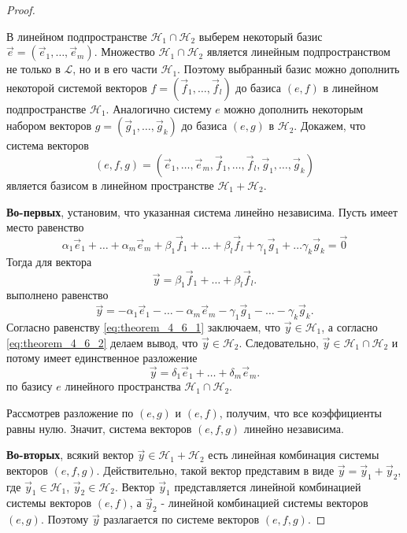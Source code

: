 \begin{proof}~

    В линейном подпространстве $\mathcal{H}_1 \cap \mathcal{H}_2$ выберем некоторый базис $\vec{e} = (\vec{e}_1, \ldots, \vec{e}_m)$. Множество $\mathcal{H}_1 \cap \mathcal{H}_2$ является линейным подпространством не только в $\mathcal{L}$, но и в его части $\mathcal{H}_1$. Поэтому выбранный базис можно дополнить некоторой системой векторов $f = (\vec{f}_1, \ldots, \vec{f}_l)$ до базиса $(e, f)$ в линейном подпространстве $\mathcal{H}_1$. Аналогично систему $e$ можно дополнить некоторым набором векторов $g = (\vec{g}_1, \ldots, \vec{g}_k)$ до базиса $(e, g)$ в $\mathcal{H}_2$. Докажем, что система векторов
    $$(e, f, g) = (\vec{e}_1, \ldots, \vec{e}_m, \vec{f}_1, \ldots, \vec{f}_l, \vec{g}_1, \ldots, \vec{g}_k)$$
    является базисом в линейном пространстве $\mathcal{H}_1 + \mathcal{H}_2$.

    \textbf{Во-первых}, установим, что указанная система линейно независима. Пусть имеет место равенство
    $$\alpha_1\vec{e}_1 + \ldots + \alpha_m\vec{e}_m + \beta_1\vec{f}_1 + \ldots + \beta_l\vec{f}_l + \gamma_1\vec{g}_1 + \ldots \gamma_k\vec{g}_k = \vec{0}$$
    Тогда для вектора
    \begin{equation}
        \vec{y} = \beta_1\vec{f}_1 + \ldots + \beta_l\vec{f}_l.
        \label{eq:theorem_4_6_1}
    \end{equation}
    выполнено равенство
    \begin{equation}
        \vec{y} = -\alpha_1\vec{e}_1 - \ldots -\alpha_m\vec{e}_m - \gamma_1\vec{g}_1 - \ldots - \gamma_k\vec{g}_k.
        \label{eq:theorem_4_6_2}
    \end{equation}
    Согласно равенству \eqref{eq:theorem_4_6_1} заключаем, что $\vec{y} \in \mathcal{H}_1$, а согласно \eqref{eq:theorem_4_6_2} делаем вывод, что $\vec{y} \in \mathcal{H}_2$. Следовательно, $\vec{y} \in \mathcal{H}_1 \cap \mathcal{H}_2$ и потому имеет единственное разложение
    \begin{equation}
        \vec{y} = \delta_1\vec{e}_1 + \ldots + \delta_m\vec{e}_m.
        \label{fig:theorem_4_6_3}
    \end{equation}
    по базису $e$ линейного пространства $\mathcal{H}_1 \cap \mathcal{H}_2$.

    Рассмотрев разложение по $(e, g)$ и $(e, f)$, получим, что все коэффициенты равны нулю. Значит, система векторов $(e, f, g)$ линейно независима.

    \textbf{Во-вторых}, всякий вектор $\vec{y} \in \mathcal{H}_1 + \mathcal{H}_2$ есть линейная комбинация системы векторов $(e, f, g)$. Действительно, такой вектор представим в виде $\vec{y} = \vec{y}_1 + \vec{y}_2$, где $\vec{y}_1 \in \mathcal{H}_1$, $\vec{y}_2 \in \mathcal{H}_2$. Вектор $\vec{y}_1$ представляется линейной комбинацией системы векторов $(e, f)$, а $\vec{y}_2$ - линейной комбинацией системы векторов $(e, g)$. Поэтому $\vec{y}$ разлагается по системе векторов $(e, f, g)$.


\end{proof}
